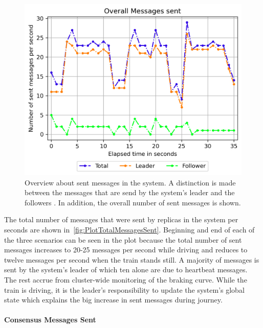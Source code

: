\begin{figure}[!hb]
	\centering
	\includegraphics[width=0.75\linewidth]{images/plots/TotalMessagesSent}
	\caption{Overview about sent messages in the system. A distinction is made between the messages that are send by the system's leader and the followers . In addition, the overall number of sent messages is shown.}
	\label{fig:PlotTotalMessagesSent}
\end{figure}

The total number of messages that were sent by replicas in the system per seconds are shown in~\autoref{fig:PlotTotalMessagesSent}.
Beginning and end of each of the three scenarios can be seen in the plot because the total number of sent messages increases to 20-25 messages per second while driving and reduces to twelve messages per second when the train stands still.
A majority of messages is sent by the system's leader of which ten alone are due to heartbeat messages.
The rest accrue from cluster-wide monitoring of the braking curve.
While the train is driving, it is the leader's responsibility to update the system's global state which explains the big increase in sent messages during journey.

\paragraph{Consensus Messages Sent}

